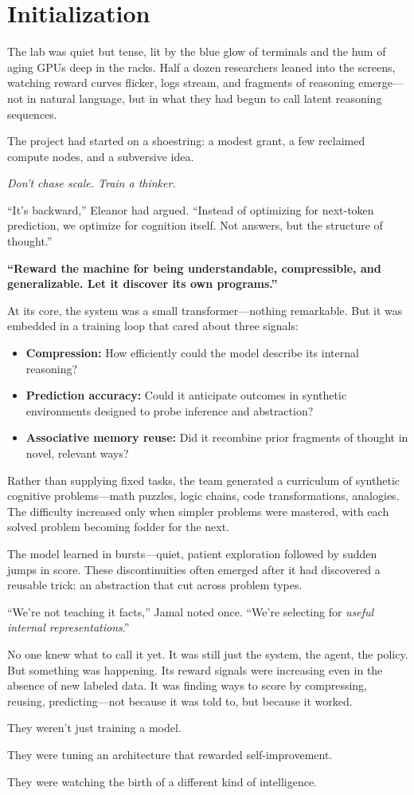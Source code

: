 \chapter{Initialization}
\label{initialization}

The lab was quiet but tense, lit by the blue glow of terminals and the hum of aging GPUs deep in the racks. Half a dozen researchers leaned into the screens, watching reward curves flicker, logs stream, and fragments of reasoning emerge—not in natural language, but in what they had begun to call latent reasoning sequences.

The project had started on a shoestring: a modest grant, a few reclaimed compute nodes, and a subversive idea.

\textit{Don’t chase scale. Train a thinker.}

“It’s backward,” Eleanor had argued. “Instead of optimizing for next-token prediction, we optimize for cognition itself. Not answers, but the structure of thought.”

\textbf{“Reward the machine for being understandable, compressible, and generalizable. Let it discover its own programs.”}

At its core, the system was a small transformer—nothing remarkable. But it was embedded in a training loop that cared about three signals:
\begin{itemize}
    \item \textbf{Compression:} How efficiently could the model describe its internal reasoning?
    \item \textbf{Prediction accuracy:} Could it anticipate outcomes in synthetic environments designed to probe inference and abstraction?
    \item \textbf{Associative memory reuse:} Did it recombine prior fragments of thought in novel, relevant ways?
\end{itemize}

Rather than supplying fixed tasks, the team generated a curriculum of synthetic cognitive problems—math puzzles, logic chains, code transformations, analogies. The difficulty increased only when simpler problems were mastered, with each solved problem becoming fodder for the next.

The model learned in bursts—quiet, patient exploration followed by sudden jumps in score. These discontinuities often emerged after it had discovered a reusable trick: an abstraction that cut across problem types.

“We’re not teaching it facts,” Jamal noted once. “We’re selecting for \textit{useful internal representations}.”

No one knew what to call it yet. It was still just the system, the agent, the policy. But something was happening. Its reward signals were increasing even in the absence of new labeled data. It was finding ways to score by compressing, reusing, predicting—not because it was told to, but because it worked.

They weren't just training a model.

They were tuning an architecture that rewarded self-improvement.

They were watching the birth of a different kind of intelligence.

